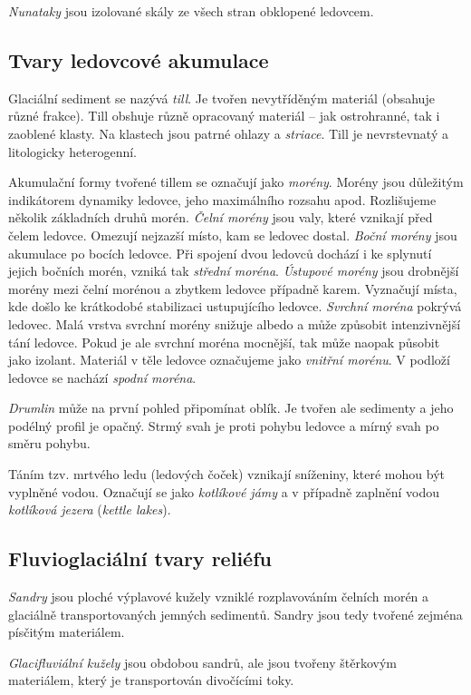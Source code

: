 \emph{Nunataky} jsou izolované skály ze všech stran obklopené ledovcem.

\subsection{Tvary ledovcové akumulace}
Glaciální sediment se nazývá \emph{till}. Je tvořen nevytříděným materiál (obsahuje různé frakce). Till obshuje různě opracovaný materiál -- jak ostrohranné, tak i zaoblené klasty. Na klastech jsou patrné ohlazy a \emph{striace}. Till je nevrstevnatý a litologicky heterogenní.

Akumulační formy tvořené tillem se označují jako \emph{morény}. Morény jsou důležitým indikátorem dynamiky ledovce, jeho maximálního rozsahu apod. Rozlišujeme několik základních druhů morén. \emph{Čelní morény} jsou valy, které vznikají před čelem ledovce. Omezují nejzazší místo, kam se ledovec dostal. \emph{Boční morény} jsou akumulace po bocích ledovce. Při spojení dvou ledovců dochází i ke splynutí jejich bočních morén, vzniká tak \emph{střední moréna}. \emph{Ústupové morény} jsou drobnější morény mezi čelní morénou a zbytkem ledovce případně karem. Vyznačují místa, kde došlo ke krátkodobé stabilizaci ustupujícího ledovce. \emph{Svrchní moréna} pokrývá ledovec. Malá vrstva svrchní morény snižuje albedo a může způsobit intenzivnější tání ledovce. Pokud je ale svrchní moréna mocnější, tak může naopak působit jako izolant. Materiál v těle ledovce označujeme jako \emph{vnitřní morénu}. V podloží ledovce se nachází \emph{spodní moréna}.

\emph{Drumlin} může na první pohled připomínat oblík. Je tvořen ale sedimenty a jeho podélný profil je opačný. Strmý svah je proti pohybu ledovce a mírný svah po směru pohybu. 

Táním tzv. mrtvého ledu (ledových čoček) vznikají sníženiny, které mohou být vyplněné vodou. Označují se jako \emph{kotlíkové jámy} a v případně zaplnění vodou \emph{kotlíková jezera} (\textit{kettle lakes}).

\subsection{Fluvioglaciální tvary reliéfu}
\emph{Sandry} jsou ploché výplavové kužely vzniklé rozplavováním čelních morén a glaciálně transportovaných jemných sedimentů. Sandry jsou tedy tvořené zejména písčitým materiálem. 

\emph{Glacifluviální kužely} jsou obdobou sandrů, ale jsou tvořeny štěrkovým materiálem, který je transportován divočícími toky.

